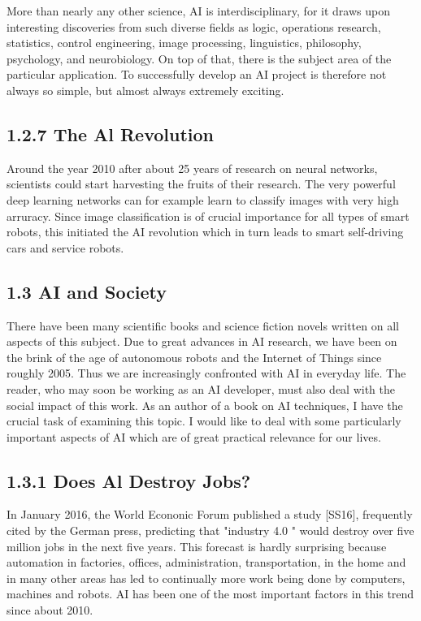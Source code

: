 \documentclass[10pt]{book}
\begin{document}
More than nearly any other science, AI is interdisciplinary, for it draws upon interesting discoveries from such diverse fields as logic, operations research, statistics, control engineering, image processing, linguistics, philosophy, psychology, and neurobiology. On top of that, there is the subject area of the particular application. To successfully develop an AI project is therefore not always so simple, but almost always extremely exciting.

\subsection*{1.2.7 The Al Revolution}
Around the year 2010 after about 25 years of research on neural networks, scientists could start harvesting the fruits of their research. The very powerful deep learning networks can for example learn to classify images with very high arruracy. Since image classification is of crucial importance for all types of smart robots, this initiated the AI revolution which in turn leads to smart self-driving cars and service robots.

\subsection*{1.3 AI and Society}
There have been many scientific books and science fiction novels written on all aspects of this subject. Due to great advances in AI research, we have been on the brink of the age of autonomous robots and the Internet of Things since roughly 2005. Thus we are increasingly confronted with AI in everyday life. The reader, who may soon be working as an AI developer, must also deal with the social impact of this work. As an author of a book on AI techniques, I have the crucial task of examining this topic. I would like to deal with some particularly important aspects of AI which are of great practical relevance for our lives.

\subsection*{1.3.1 Does Al Destroy Jobs?}
In January 2016, the World Econonic Forum published a study [SS16], frequently cited by the German press, predicting that "industry 4.0 " would destroy over five\\
million jobs in the next five years. This forecast is hardly surprising because automation in factories, offices, administration, transportation, in the home and in many other areas has led to continually more work being done by computers, machines and robots. AI has been one of the most important factors in this trend since about 2010.
\end{document}
